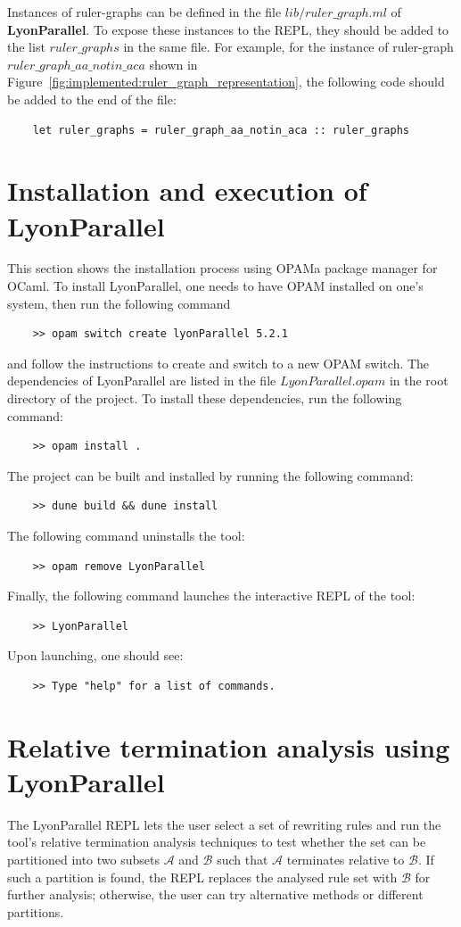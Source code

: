 Instances of ruler-graphs can be defined in the file \colorbox{Ivory2}{$lib/ruler\_graph.ml$} of \textbf{LyonParallel}. To expose these instances to the REPL, they should be added to the list \colorbox{Ivory2}{$ruler\_graphs$} in the same file. For example, for the instance of ruler-graph \colorbox{Ivory2}{$ruler\_graph\_aa\_notin\_aca$} shown in Figure~\ref{fig:implemented:ruler_graph_representation}, the following code should be added to the end of the file:
\begin{lstlisting}
    let ruler_graphs = ruler_graph_aa_notin_aca :: ruler_graphs 
\end{lstlisting}
 
\section{Installation and execution of LyonParallel}
\label{lyonparallel:sec:installation}
This section shows the installation process using \colorbox{Ivory2}{OPAM}\textemdash{}a package manager for OCaml. To install LyonParallel, one needs to have \colorbox{Ivory2}{OPAM} installed on one's system, then 
run the following command
\begin{lstlisting}
    >> opam switch create lyonParallel 5.2.1
\end{lstlisting}
 and follow the instructions to create and switch to a new \colorbox{Ivory2}{OPAM} switch. 
 The dependencies of LyonParallel are listed in the file \colorbox{Ivory2}{$LyonParallel.opam$} in the root directory of the project. To install these dependencies, run the following command:
\begin{lstlisting}
    >> opam install .
\end{lstlisting}
The project can be built and installed by running the following command:
\begin{lstlisting}
    >> dune build && dune install
\end{lstlisting}
The following command uninstalls the tool:
\begin{lstlisting}
    >> opam remove LyonParallel
\end{lstlisting}
Finally, the following command launches the interactive REPL of the tool:
\begin{lstlisting}
    >> LyonParallel
\end{lstlisting}
Upon launching, one should see:
\begin{lstlisting}
    >> Type "help" for a list of commands.
\end{lstlisting}
\section{Relative termination analysis using LyonParallel}
\label{lyonparallel:sec:termination}
The LyonParallel REPL lets the user select a set of rewriting rules and run the tool's relative termination analysis techniques to test whether the set can be partitioned into two subsets \(\mathcal{A}\) and \(\mathcal{B}\) such that \(\mathcal{A}\) terminates relative to \(\mathcal{B}\). If such a partition is found, the REPL replaces the analysed rule set with \(\mathcal{B}\) for further analysis; otherwise, the user can try alternative methods or different partitions.

